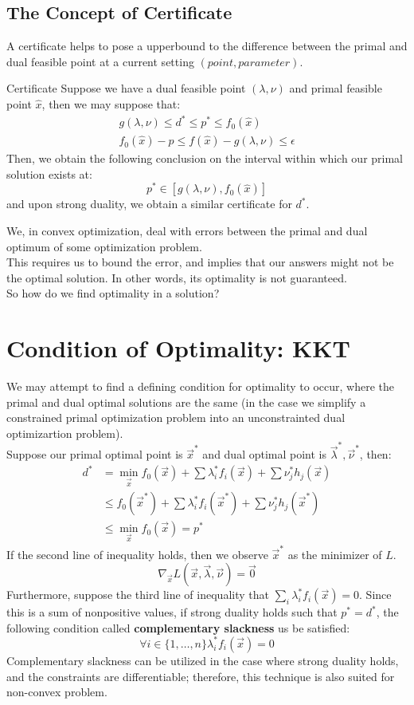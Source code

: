 \subsection{The Concept of Certificate}
A certificate helps to pose a upperbound to the difference between the primal and dual feasible point at a current setting $(point, parameter)$.
\begin{ln-define}{Certificate}{}
    Suppose we have a dual feasible point $(\lambda, \nu)$ and primal feasible point $\hat{x}$, then we may suppose that:
    \begin{align*}
        g (\lambda, \nu) \leq d^* \leq p^* \leq f_0 (\hat{x}) \\
        f_0 (\hat{x}) - p \leq f(\hat{x}) - g(\lambda, \nu) \leq \epsilon
    \end{align*}
    Then, we obtain the following conclusion on the interval within which our primal solution exists at:
    \[
        p^* \in [g(\lambda, \nu), f_0 (\hat{x})]
    \]
    and upon strong duality, we obtain a similar certificate for $d^*$.
\end{ln-define}
We, in convex optimization, deal with errors between the primal and dual optimum of some optimization problem. \\
This requires us to bound the error, and implies that our answers might not be the optimal solution. In other words, its optimality is not guaranteed. \\
So how do we find optimality in a solution?

\section{Condition of Optimality: KKT}
We may attempt to find a defining condition for optimality to occur, where the primal and dual optimal solutions are the same (in the case we simplify a constrained primal optimization problem into an unconstrainted dual optimizartion problem). \\
Suppose our primal optimal point is $\vec{x}^*$ and dual optimal point is $\vec{\lambda}^*, \vec{\nu}^*$, then:
\begin{align*}
    d^* &= \min_{\vec{x}} f_0 (\vec{x}) + \sum \lambda_i^* f_i (\vec{x}) + \sum \nu_j^* h_j (\vec{x}) \\
    &\leq f_0 (\vec{x}^*) + \sum \lambda_i^* f_i (\vec{x}^*) + \sum \nu_j^* h_j (\vec{x}^*) \\
    &\leq \min_{\vec{x}} f_0 (\vec{x}) = p^*
\end{align*}
If the second line of inequality holds, then we observe $\vec{x}^*$ as the minimizer of $L$.
\[
    \nabla_{\vec{x}} L(\vec{x}, \vec{\lambda}, \vec{\nu}) = \vec{0}
\]
Furthermore, suppose the third line of inequality that $\sum_i \lambda_i^* f_i(\vec{x}) = 0$.
Since this is a sum of nonpositive values, if strong duality holds such that $p^* = d^*$, the following condition called \textbf{complementary slackness} us be satisfied:
\[
    \forall i \in \{1, \dots, n\} \lambda_i^* f_i(\vec{x}) = 0
\]
Complementary slackness can be utilized in the case where strong duality holds, and the constraints are differentiable; therefore, this technique is also suited for non-convex problem.

